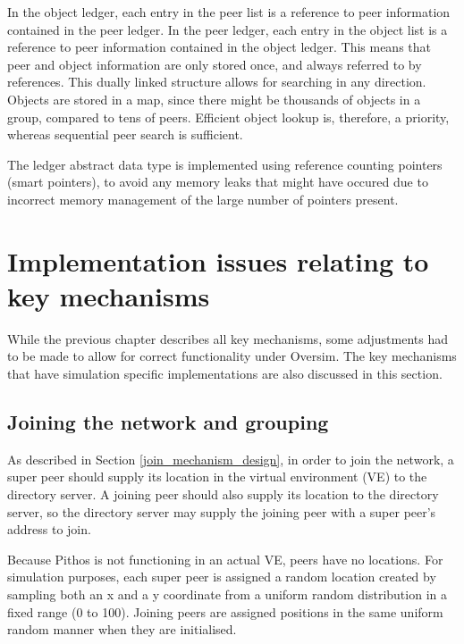 In the object ledger, each entry in the peer list is a reference to peer information contained in the peer ledger. In the peer ledger, each entry in the object list is a reference to peer information contained in the object ledger. This means that peer and object information are only stored once, and always referred to by references. This dually linked structure allows for searching in any direction. Objects are stored in a map, since there might be thousands of objects in a group, compared to tens of peers. Efficient object lookup is, therefore, a priority, whereas sequential peer search is sufficient.

The ledger abstract data type is implemented using reference counting pointers (smart pointers), to avoid any memory leaks that might have occured due to incorrect memory management of the large number of pointers present.

\section{Implementation issues relating to key mechanisms}
\label{key_mechanisms}


While the previous chapter describes all key mechanisms, some adjustments had to be made to allow for correct functionality under Oversim. The key mechanisms that have simulation specific implementations are also discussed in this section.

\subsection{Joining the network and grouping}

As described in Section \ref{join_mechanism_design}, in order to join the network, a super peer should supply its location in the virtual environment (VE) to the directory server. A joining peer should also supply its location to the directory server, so the directory server may supply the joining peer with a super peer's address to join.

Because Pithos is not functioning in an actual VE, peers have no locations. For simulation purposes, each super peer is assigned a random location created by sampling both an x and a y coordinate from a uniform random distribution in a fixed range (0 to 100). Joining peers are assigned positions in the same uniform random manner when they are initialised.

